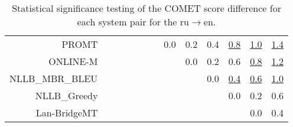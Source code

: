 \documentclass[11pt]{article}
\begin{document}
\begin{sidewaystable}
\begin{center}
{\begin{tabular}{rcccccccccccc}
PROMT &  &  &  &  &  &  & \cellcolor{red!0} 0.0 & \cellcolor{red!20} 0.2 & \cellcolor{red!30} 0.4 & \cellcolor{red!70} \underline{0.8} & \cellcolor{red!70} \underline{1.0} & \cellcolor{red!70} \underline{1.4}\\ 
ONLINE-M &  &  &  &  &  &  &  & \cellcolor{red!0} 0.0 & \cellcolor{red!0} 0.2 & \cellcolor{red!60} 0.6 & \cellcolor{red!70} \underline{0.8} & \cellcolor{red!70} \underline{1.2}\\ 
NLLB\_MBR\_BLEU &  &  &  &  &  &  &  &  & \cellcolor{red!0} 0.0 & \cellcolor{red!70} \underline{0.4} & \cellcolor{red!70} \underline{0.6} & \cellcolor{red!70} \underline{1.0}\\ 
NLLB\_Greedy &  &  &  &  &  &  &  &  &  & \cellcolor{red!0} 0.0 & \cellcolor{red!0} 0.2 & \cellcolor{red!40} 0.6\\ 
Lan-BridgeMT &  &  &  &  &  &  &  &  &  &  & \cellcolor{red!0} 0.0 & \cellcolor{red!0} 0.4\\ 
\bottomrule 
\end{tabular} }
\caption{Statistical significance testing of the COMET score difference for each system pair for the ru$\rightarrow$en.} 
 \end{center} \end{sidewaystable} 
\end{document}

